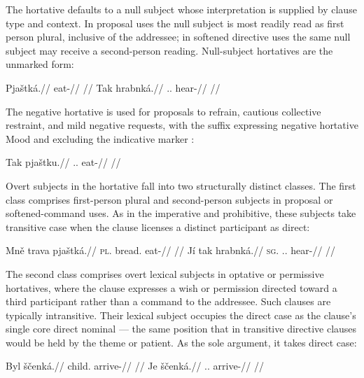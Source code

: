 The hortative defaults to a null subject whose interpretation is supplied by
clause type and context. In proposal uses the null subject is most readily read
as first person plural, inclusive of the addressee; in softened directive uses
the same null subject may receive a second-person reading. Null-subject
hortatives are the unmarked form:

\pex
\a
\begingl
\gla Pjaštká.//
\glb eat-\Hort{}//
\glft {} //
\endgl
\a
\begingl
\gla Tak hrabnká.//
\glb \Dem{}.\Prox{}.\Dir{} hear-\Hort{}//
\glft {} //
\endgl
\xe

The negative hortative  is used for proposals to refrain, cautious
collective restraint, and mild negative requests, with the suffix expressing
negative hortative Mood and excluding the indicative marker :

\pex
\a
\begingl
\gla Tak pjaštku.//
\glb \Dem{}.\Prox{}.\Dir{} eat-\Neg{}\Hort{}//
\glft {} //
\endgl
\xe

Overt subjects in the hortative fall into two structurally distinct classes. The
first class comprises first-person plural and second-person subjects in
proposal or softened-command uses. As in the imperative and prohibitive,
these subjects take transitive case when the clause licenses a distinct
participant as direct:

\pex
\a
\begingl
\gla Mně trava pjaštká.//
\textsc{pl}.\Trs{} bread.\Dir{} eat-\Hort{}//
\glft {} //
\endgl
\a
\begingl
\gla Jí tak hrabnká.//
\textsc{sg}.\Trs{} \Dem{}.\Prox{}.\Dir{} hear-\Hort{}//
\glft {} //
\endgl
\xe

The second class comprises overt lexical subjects in optative or permissive
hortatives, where the clause expresses a wish or permission directed toward a
third participant rather than a command to the addressee. Such clauses are
typically intransitive. Their lexical subject occupies the direct case as the
clause's single core direct nominal --- the same position that in transitive
directive clauses would be held by the theme or patient. As the sole argument, it takes
direct case:

\pex
\a
\begingl
\gla Byl ščenká.//
\glb child.\Dir{} arrive-\Hort{}//
\glft {} //
\endgl
\a
\begingl
\gla Je ščenká.//
\glb \Dem{}.\Dist{}.\Dir{} arrive-\Hort{}//
\glft {} //
\endgl
\xe

